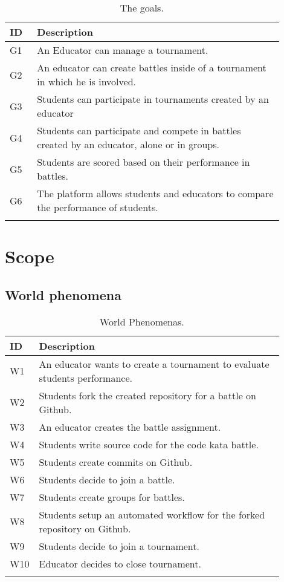 \begin{center}
    \begin{longtable}{ |l|p{0.9\linewidth}| }
        \hline
        \textbf{ID} & \textbf{Description}\\
        \hline
        G1 & An Educator can manage a tournament. \\
        \hline
        G2 & An educator can create battles inside of a tournament in which he is involved. \\
        \hline
        G3 & Students can participate in tournaments created by an educator\\
        \hline
        G4 & Students can participate and compete in battles created by an educator, alone or in groups. \\
        \hline
        G5 & Students are scored based on their performance in battles. \\
        \hline
        G6 & The platform allows students and educators to compare the performance of students. \\
        \hline
        \caption{The goals.}
    \end{longtable}
\end{center}


\section{Scope}
\subsection{World phenomena}
\begin{center}
    \begin{longtable}{ |l|p{0.9\linewidth}| }
        \hline
        \textbf{ID} & \textbf{Description}\\
        \hline
        W1 & An educator wants to create a tournament to evaluate students performance. \\
        \hline
        W2 & Students fork the created repository for a battle on Github. \\
        \hline
        W3 & An educator creates the battle assignment. \\
        \hline
        W4 & Students write source code for the code kata battle. \\
        \hline
        W5 & Students create commits on Github. \\
        \hline
        W6 & Students decide to join a battle. \\
        \hline
        W7 & Students create groups for battles. \\
        \hline
        W8 & Students setup an automated workflow for the forked repository on Github. \\
        \hline
        W9 & Students decide to join a tournament. \\
        \hline
        W10 & Educator decides to close tournament. \\
        \hline
        \caption{World Phenomenas.}
    \end{longtable}
\end{center}
